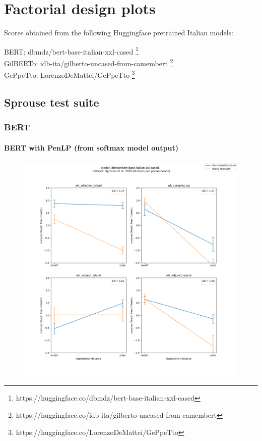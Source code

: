 \chapter{Factorial design plots}

Scores obtained from the following Huggingface pretrained Italian models:

BERT: dbmdz/bert-base-italian-xxl-cased \footnote{https://huggingface.co/dbmdz/bert-base-italian-xxl-cased} \\
GilBERTo: idb-ita/gilberto-uncased-from-camembert \footnote{https://huggingface.co/idb-ita/gilberto-uncased-from-camembert} \\
GePpeTto: LorenzoDeMattei/GePpeTto \citep{de2020geppetto} \footnote{https://huggingface.co/LorenzoDeMattei/GePpeTto} \\

\clearpage
\section{Sprouse test suite}
\subsection{BERT}
\subsubsection{BERT with PenLP (from softmax model output)}
\begin{figure}[h]
	\centering
	\includegraphics[width=1\textwidth]{images/AppendixA/Sprouse_wh_dbmdz_bert-base-italian-xxl-cased_PenLP-zscores-likert-2022-09-14_h17m26s15.png} 
	\label{A-fig:bert_penlp_sprouse}
\end{figure}

